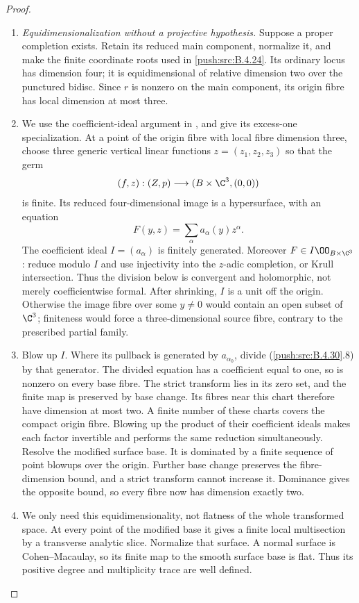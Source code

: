 \begin{proof}
\begin{enumerate}[label=\arabic*.,leftmargin=*]
\item \emph{Equidimensionalization without a projective hypothesis.}
Suppose a proper completion exists. Retain its
reduced main component, normalize it, and make
the finite coordinate roots used in \ref{push:src:B.4.24}.
Its ordinary locus has dimension four; it is
equidimensional of relative dimension two
over the punctured bidisc. Since $r$ is
nonzero on the main component, its origin
fibre has local dimension at most three.

\item We use the coefficient-ideal argument in
\citet[Corollary 1.2 and its proof,
manuscript pp.~3--6]{Parusinski1990E}, and give
its excess-one specialization. At a point of
the origin fibre with local fibre dimension
three, choose three generic vertical linear
functions $z=(z_1,z_2,z_3)$ so that the germ
\[
 (f,z): (Z,p)\longrightarrow(B\times\C^3,(0,0))
\]
is finite. Its reduced four-dimensional image
is a hypersurface, with an equation
\[
 F(y,z)=\sum_\alpha a_\alpha(y)z^\alpha.
 \tag{B.4.30.8}
\]
The coefficient ideal $I=(a_\alpha)$ is finitely
generated. Moreover $F\in I\OO_{B\times\C^3}$:
reduce modulo $I$ and use injectivity into
the $z$-adic completion, or Krull intersection.
Thus the division below is convergent and
holomorphic, not merely coefficientwise formal.
After shrinking, $I$ is a unit off the origin. Otherwise the image fibre over
some $y\ne0$ would contain an open subset of
$\C^3$; finiteness would force a
three-dimensional source fibre, contrary to
the prescribed partial family.

\item Blow up $I$. Where its pullback is generated
by $a_{\alpha_0}$, divide (\ref{push:src:B.4.30}.8) by that
generator. The divided equation has a
coefficient equal to one, so is nonzero on
every base fibre. The strict transform lies
in its zero set, and the finite map is
preserved by base change. Its fibres near
this chart therefore have dimension at most
two. A finite number of these charts covers
the compact origin fibre. Blowing up the
product of their coefficient ideals makes
each factor invertible and performs the same
reduction simultaneously. Resolve the
modified surface base. It is dominated by a
finite sequence of point blowups over the
origin. Further base change preserves the
fibre-dimension bound, and a strict transform
cannot increase it. Dominance gives the
opposite bound, so every fibre now has
dimension exactly two.

\item We only need this equidimensionality, not
flatness of the whole transformed space.
At every point of the modified base it gives
a finite local multisection by a transverse
analytic slice. Normalize that surface. A
normal surface is Cohen--Macaulay, so its
finite map to the smooth surface base is
flat. Thus its positive degree and
multiplicity trace are well defined.


\end{enumerate}
\end{proof}

